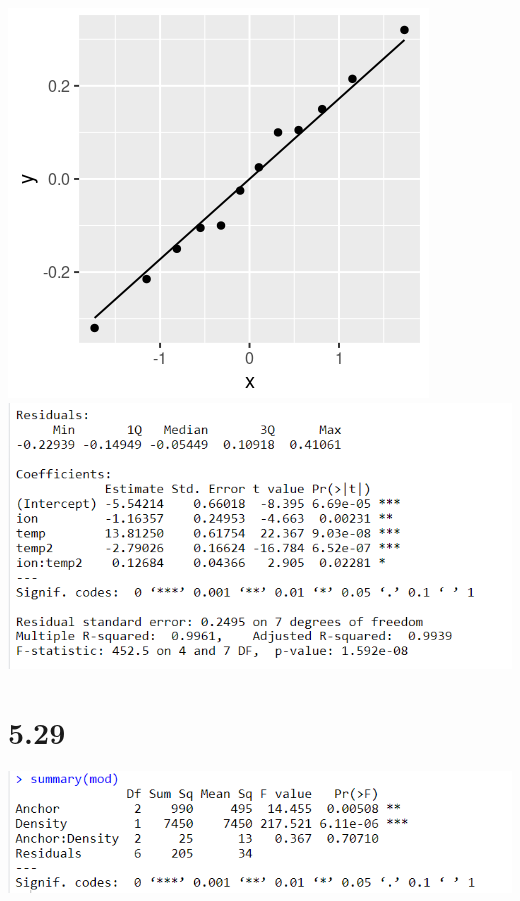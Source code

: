 \documentclass{article}
\begin{document}
\includegraphics{5.26cQQ.PNG}
\\\includegraphics{5.26dlm.PNG}

\section*{5.29}
\includegraphics{5.29a.PNG}
\end{document}

